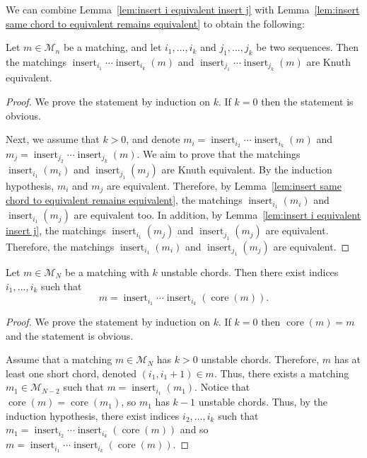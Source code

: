 \documentclass[ALCO]{cedram}
\newcommand{\core}{\operatorname{core}}
\newcommand{\insrt}{\operatorname{insert}}
\newcommand{\M}{\mathcal{M}}
\begin{document}
We can combine Lemma~\ref{lem:insert i equivalent insert j} with Lemma~\ref{lem:insert same chord to equivalent remains equivalent} to obtain the following:
\begin{lemma}
\label{lem:insert many chords to matching is equivalent}
    Let $m \in \M_n$ be a matching, and let $i_1,\dots, i_k$ and $j_1,\dots, j_k$ be two sequences. Then the matchings $\insrt_{i_1}\cdots\insrt_{i_k}(m)$ and $\insrt_{j_1}\cdots\insrt_{j_k}(m)$ are Knuth equivalent.
\end{lemma}

\begin{proof}
    We prove the statement by induction on $k$. If $k=0$ then the statement is obvious.

    Next, we assume that $k > 0$, and denote $m_i = \insrt_{i_2}\cdots\insrt_{i_k}(m)$ and $m_j = \insrt_{j_2}\cdots\insrt_{j_k}(m)$. We aim to prove that the matchings $\insrt_{i_1}(m_i)$ and $\insrt_{j_1}(m_j)$ are Knuth equivalent. By the induction hypothesis, $m_i$ and $m_j$ are equivalent. Therefore, by Lemma~\ref{lem:insert same chord to equivalent remains equivalent}, the matchings $\insrt_{i_1}(m_i)$ and $\insrt_{i_1}(m_j)$ are equivalent too. In addition, by Lemma~\ref{lem:insert i equivalent insert j}, the matchings $\insrt_{i_1}(m_j)$ and $\insrt_{j_1}(m_j)$ are equivalent. Therefore, the matchings $\insrt_{i_1}(m_i)$ and $\insrt_{j_1}(m_j)$ are equivalent.
\end{proof}

\begin{lemma}
\label{lem:matching is generated by inserts to its core}
    Let $m \in \M_N$ be a matching with $k$ unstable chords. Then there exist indices $i_1, \dots, i_k$ such that
    \[
        m = \insrt_{i_1}\cdots\insrt_{i_k}(\core(m)).
    \]
\end{lemma}

\begin{proof}
    We prove the statement by induction on $k$. If $k=0$ then $\core(m) = m$ and the statement is obvious.

    Assume that a matching $m \in \M_N$ has $k > 0$ unstable chords. Therefore, $m$ has at least one short chord, denoted $(i_1,i_1+1) \in m$. Thus, there exists a matching $m_1 \in \M_{N-2}$ such that $m = \insrt_{i_1}(m_1)$. Notice that $\core(m) = \core(m_1)$, so $m_1$ has $k-1$ unstable chords. Thus, by the induction hypothesis, there exist indices $i_2,\dots,i_k$ such that $m_1 = \insrt_{i_2}\cdots\insrt_{i_k}(\core(m))$ and so $m = \insrt_{i_1}\cdots\insrt_{i_k}(\core(m))$.
\end{proof}
\end{document}
